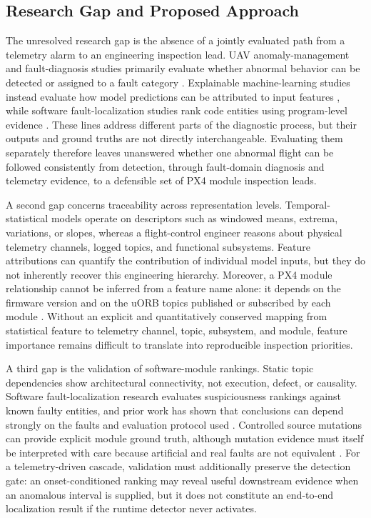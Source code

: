 \subsection{Research Gap and Proposed Approach}

The unresolved research gap is the absence of a jointly evaluated path from a telemetry alarm to an engineering inspection lead. UAV anomaly-management and fault-diagnosis studies primarily evaluate whether abnormal behavior can be detected or assigned to a fault category \cite{fourlas2021survey,tan2026anomaly,wei2026aerotsboost}. Explainable machine-learning studies instead evaluate how model predictions can be attributed to input features \cite{lundberg2017shap,lundberg2020trees}, while software fault-localization studies rank code entities using program-level evidence \cite{wong2016survey}. These lines address different parts of the diagnostic process, but their outputs and ground truths are not directly interchangeable. Evaluating them separately therefore leaves unanswered whether one abnormal flight can be followed consistently from detection, through fault-domain diagnosis and telemetry evidence, to a defensible set of PX4 module inspection leads.

A second gap concerns traceability across representation levels. Temporal-statistical models operate on descriptors such as windowed means, extrema, variations, or slopes, whereas a flight-control engineer reasons about physical telemetry channels, logged topics, and functional subsystems. Feature attributions can quantify the contribution of individual model inputs, but they do not inherently recover this engineering hierarchy. Moreover, a PX4 module relationship cannot be inferred from a feature name alone: it depends on the firmware version and on the uORB topics published or subscribed by each module \cite{meier2015px4,px4uorbdocs2026}. Without an explicit and quantitatively conserved mapping from statistical feature to telemetry channel, topic, subsystem, and module, feature importance remains difficult to translate into reproducible inspection priorities.

A third gap is the validation of software-module rankings. Static topic dependencies show architectural connectivity, not execution, defect, or causality. Software fault-localization research evaluates suspiciousness rankings against known faulty entities, and prior work has shown that conclusions can depend strongly on the faults and evaluation protocol used \cite{wong2016survey,pearson2017evaluating}. Controlled source mutations can provide explicit module ground truth, although mutation evidence must itself be interpreted with care because artificial and real faults are not equivalent \cite{papadakis2019mutation}. For a telemetry-driven cascade, validation must additionally preserve the detection gate: an onset-conditioned ranking may reveal useful downstream evidence when an anomalous interval is supplied, but it does not constitute an end-to-end localization result if the runtime detector never activates.


